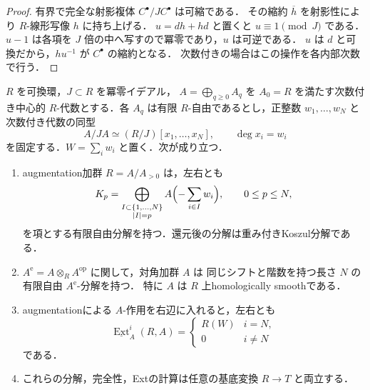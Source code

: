 \begin{proof}
有界で完全な射影複体 $C^\bullet/JC^\bullet$ は可縮である．
その縮約 $\overline h$ を射影性により $R$-線形写像 $h$ に持ち上げる．
$u=dh+hd$ と置くと $u\equiv1\pmod J$ である．
$u-1$ は各項を $J$ 倍の中へ写すので冪零であり，$u$ は可逆である．
$u$ は $d$ と可換だから，$h u^{-1}$ が $C^\bullet$ の縮約となる．
次数付きの場合はこの操作を各内部次数で行う．
\end{proof}

\begin{proposition}
\label{prop:nilpotent-weighted-as}
$R$ を可換環，$J\subset R$ を冪零イデアル，
$A=\bigoplus_{q\geq0}A_q$ を $A_0=R$ を満たす次数付き中心的
$R$-代数とする．各 $A_q$ は有限 $R$-自由であるとし，正整数
$w_1,\ldots,w_N$ と次数付き代数の同型
\[
 A/JA\simeq (R/J)[x_1,\ldots,x_N],\qquad \deg x_i=w_i
\]
を固定する．$W=\sum_iw_i$ と置く．次が成り立つ．
\begin{enumerate}
\item augmentation加群 $R=A/A_{>0}$ は，左右とも
\[
 K_p=\bigoplus_{\substack{I\subset\{1,\ldots,N\}\\|I|=p}}
 A\Bigl(-\sum_{i\in I}w_i\Bigr),\qquad0\leq p\leq N,
\]
を項とする有限自由分解を持つ．還元後の分解は重み付きKoszul分解である．
\item $A^{\mathrm e}=A\otimes_R A^{\mathrm{op}}$ に関して，対角加群 $A$ は
同じシフトと階数を持つ長さ $N$ の有限自由 $A^{\mathrm e}$-分解を持つ．
特に $A$ は $R$ 上homologically smoothである．
\item augmentationによる $A$-作用を右辺に入れると，左右とも
\[
 \underline{\operatorname{Ext}}_A^i(R,A)=
 \begin{cases}R(W)&i=N,\\0&i\neq N\end{cases}
\]
である．
\item これらの分解，完全性，Extの計算は任意の基底変換 $R\to T$ と両立する．
\end{enumerate}
\end{proposition}

